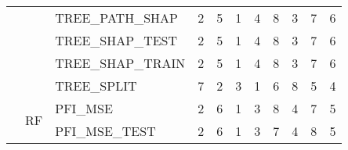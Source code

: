 \begin{table}
\begin{tabular}{lllrrrrrrrr}
 &  & TREE\_PATH\_SHAP & {\cellcolor[HTML]{6788EE}} \color[HTML]{F1F1F1} 2 & {\cellcolor[HTML]{EDD1C2}} \color[HTML]{000000} 5 & {\cellcolor[HTML]{3B4CC0}} \color[HTML]{F1F1F1} 1 & {\cellcolor[HTML]{C9D7F0}} \color[HTML]{000000} 4 & {\cellcolor[HTML]{B40426}} \color[HTML]{F1F1F1} 8 & {\cellcolor[HTML]{9ABBFF}} \color[HTML]{000000} 3 & {\cellcolor[HTML]{E26952}} \color[HTML]{F1F1F1} 7 & {\cellcolor[HTML]{F7A889}} \color[HTML]{000000} 6 \\
 &  & TREE\_SHAP\_TEST & {\cellcolor[HTML]{6788EE}} \color[HTML]{F1F1F1} 2 & {\cellcolor[HTML]{EDD1C2}} \color[HTML]{000000} 5 & {\cellcolor[HTML]{3B4CC0}} \color[HTML]{F1F1F1} 1 & {\cellcolor[HTML]{C9D7F0}} \color[HTML]{000000} 4 & {\cellcolor[HTML]{B40426}} \color[HTML]{F1F1F1} 8 & {\cellcolor[HTML]{9ABBFF}} \color[HTML]{000000} 3 & {\cellcolor[HTML]{E26952}} \color[HTML]{F1F1F1} 7 & {\cellcolor[HTML]{F7A889}} \color[HTML]{000000} 6 \\
 &  & TREE\_SHAP\_TRAIN & {\cellcolor[HTML]{6788EE}} \color[HTML]{F1F1F1} 2 & {\cellcolor[HTML]{EDD1C2}} \color[HTML]{000000} 5 & {\cellcolor[HTML]{3B4CC0}} \color[HTML]{F1F1F1} 1 & {\cellcolor[HTML]{C9D7F0}} \color[HTML]{000000} 4 & {\cellcolor[HTML]{B40426}} \color[HTML]{F1F1F1} 8 & {\cellcolor[HTML]{9ABBFF}} \color[HTML]{000000} 3 & {\cellcolor[HTML]{E26952}} \color[HTML]{F1F1F1} 7 & {\cellcolor[HTML]{F7A889}} \color[HTML]{000000} 6 \\
 &  & TREE\_SPLIT & {\cellcolor[HTML]{E26952}} \color[HTML]{F1F1F1} 7 & {\cellcolor[HTML]{6788EE}} \color[HTML]{F1F1F1} 2 & {\cellcolor[HTML]{9ABBFF}} \color[HTML]{000000} 3 & {\cellcolor[HTML]{3B4CC0}} \color[HTML]{F1F1F1} 1 & {\cellcolor[HTML]{F7A889}} \color[HTML]{000000} 6 & {\cellcolor[HTML]{B40426}} \color[HTML]{F1F1F1} 8 & {\cellcolor[HTML]{EDD1C2}} \color[HTML]{000000} 5 & {\cellcolor[HTML]{C9D7F0}} \color[HTML]{000000} 4 \\
\cline{2-11}
 & \multirow[c]{9}{*}{RF} & PFI\_MSE & {\cellcolor[HTML]{6788EE}} \color[HTML]{F1F1F1} 2 & {\cellcolor[HTML]{F7A889}} \color[HTML]{000000} 6 & {\cellcolor[HTML]{3B4CC0}} \color[HTML]{F1F1F1} 1 & {\cellcolor[HTML]{9ABBFF}} \color[HTML]{000000} 3 & {\cellcolor[HTML]{B40426}} \color[HTML]{F1F1F1} 8 & {\cellcolor[HTML]{C9D7F0}} \color[HTML]{000000} 4 & {\cellcolor[HTML]{E26952}} \color[HTML]{F1F1F1} 7 & {\cellcolor[HTML]{EDD1C2}} \color[HTML]{000000} 5 \\
 &  & PFI\_MSE\_TEST & {\cellcolor[HTML]{6788EE}} \color[HTML]{F1F1F1} 2 & {\cellcolor[HTML]{F7A889}} \color[HTML]{000000} 6 & {\cellcolor[HTML]{3B4CC0}} \color[HTML]{F1F1F1} 1 & {\cellcolor[HTML]{9ABBFF}} \color[HTML]{000000} 3 & {\cellcolor[HTML]{E26952}} \color[HTML]{F1F1F1} 7 & {\cellcolor[HTML]{C9D7F0}} \color[HTML]{000000} 4 & {\cellcolor[HTML]{B40426}} \color[HTML]{F1F1F1} 8 & {\cellcolor[HTML]{EDD1C2}} \color[HTML]{000000} 5 \\

\end{tabular}
\end{table}
